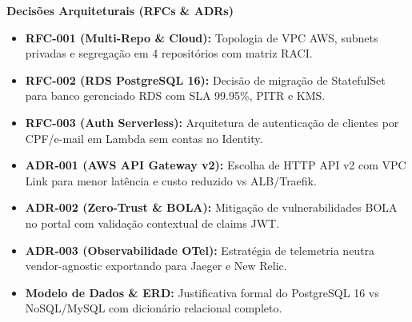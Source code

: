 \documentclass[9pt,a4paper]{article}
\begin{document}
\noindent
\begin{minipage}[t]{0.49\textwidth}
    \begin{tcolorbox}[subtlebox]
        \textbf{\color{accentblue} Decisões Arquiteturais (RFCs \& ADRs)}\par\vspace{0.08cm}
        \begin{itemize}\setlength{\itemsep}{1.5pt}\setlength{\parskip}{0pt}\scriptsize
            \item \textbf{RFC-001 (Multi-Repo \& Cloud):} Topologia de VPC AWS, subnets privadas e segregação em 4 repositórios com matriz RACI.
            \item \textbf{RFC-002 (RDS PostgreSQL 16):} Decisão de migração de StatefulSet para banco gerenciado RDS com SLA 99.95\%, PITR e KMS.
            \item \textbf{RFC-003 (Auth Serverless):} Arquitetura de autenticação de clientes por CPF/e-mail em Lambda sem contas no Identity.
            \item \textbf{ADR-001 (AWS API Gateway v2):} Escolha de HTTP API v2 com VPC Link para menor latência e custo reduzido vs ALB/Traefik.
            \item \textbf{ADR-002 (Zero-Trust \& BOLA):} Mitigação de vulnerabilidades BOLA no portal com validação contextual de claims JWT.
            \item \textbf{ADR-003 (Observabilidade OTel):} Estratégia de telemetria neutra vendor-agnostic exportando para Jaeger e New Relic.
            \item \textbf{Modelo de Dados \& ERD:} Justificativa formal do PostgreSQL 16 vs NoSQL/MySQL com dicionário relacional completo.
        \end{itemize}
    \end{tcolorbox}
\end{minipage}
\hfill
\end{document}
